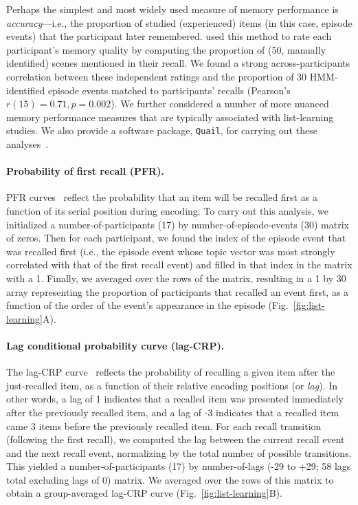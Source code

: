 \documentclass{article}
\begin{document}
Perhaps the simplest and most widely used measure of memory performance is \textit{accuracy}---i.e., the proportion of studied (experienced) items (in this case, episode events) that the participant later remembered.  \cite{ChenEtal17} used this method to rate each participant's memory quality by computing the proportion of (50, manually identified) scenes mentioned in their recall.  We found a strong across-participants correlation between these independent ratings and the proportion of 30 HMM-identified episode events matched to participants' recalls (Pearson's $r(15) = 0.71, p = 0.002$).  We further considered a number of more nuanced memory performance measures that are typically associated with list-learning studies.  We also provide a software package, \texttt{Quail}, for carrying out these analyses~\citep{HeusEtal17b}.

\paragraph{Probability of first recall (PFR).}  PFR curves~\citep{WelcBurn24, PostPhil65, AtkiShif68} reflect the probability that an item will be recalled first as a function of its serial position during encoding. To carry out this analysis, we initialized a number-of-participants (17) by number-of-episode-events (30) matrix of zeros. Then for each participant, we found the index of the episode event that was recalled first (i.e., the episode event whose topic vector was most strongly correlated with that of the first recall event) and filled in that index in the matrix with a 1.  Finally, we averaged over the rows of the matrix, resulting in a 1 by 30 array representing the proportion of participants that recalled an event first, as a function of the order of the event's appearance in the episode (Fig.~\ref{fig:list-learning}A).

\paragraph{Lag conditional probability curve (lag-CRP).} The lag-CRP curve~\citep{Kaha96} reflects the probability of recalling a given item after the just-recalled item, as a function of their relative encoding positions (or \textit{lag}).  In other words, a lag of 1 indicates that a recalled item was presented immediately after the previously recalled item, and a lag of -3 indicates that a recalled item came 3 items before the previously recalled item.  For each recall transition (following the first recall), we computed the lag between the current recall event and the next recall event, normalizing by the total number of possible transitions.  This yielded a number-of-participants (17) by number-of-lags (-29 to +29; 58 lags total excluding lags of 0) matrix. We averaged over the rows of this matrix to obtain a group-averaged lag-CRP curve (Fig.~\ref{fig:list-learning}B).
\end{document}
